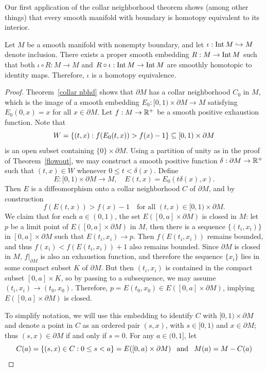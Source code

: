 Our first application of the collar neighborhood theorem shows (among other things) that every smooth manifold with boundary is homotopy equivalent to its
interior.
\begin{theorem}\label{homotopy equiv Int M to M}
Let $M$ be a smooth manifold with nonempty boundary, and let $\iota:\mathrm{Int}\, M\hookrightarrow M$ denote inclusion. There exists a proper smooth embedding $R:M\to\mathrm{Int}\, M$ such that both $\iota\circ R:M\to M$ and $R\circ\iota:\mathrm{Int}\, M\to\mathrm{Int}\, M$ are smoothly homotopic to identity maps. Therefore, $\iota$ is a homotopy equivalence.
\end{theorem}
\begin{proof}
Theorem~\ref{collar nbhd} shows that $\partial M$ has a collar neighborhood $C_0$ in $M$, which is the image of a smooth embedding $E_0:[0,1)\times\partial M\to M$ satisfying $E_0(0,x)=x$ for all $x\in\partial M$. Let $f:M\to\mathbb{R}^+$ be a smooth positive exhaustion function. Note that 
\[W=\{(t,x):f(E_0(t,x))>f(x)-1\}\subseteq [0,1)\times\partial M\] 
is an open subset containing $\{0\}\times\partial M$. Using a partition of unity as in the proof of Theorem~\ref{flowout}, we may construct a smooth positive function $\delta:\partial M\to\mathbb{R}^+$ such that $(t,x)\in W$ whenever $0\leq t<\delta(x)$. Define 
\[E:[0,1)\times\partial M\to M,\quad E(t,x)=E_0(t\delta(x),x).\] 
Then $E$ is a diffeomorphism onto a collar neighborhood $C$ of $\partial M$, and by construction 
\[f(E(t,x))>f(x)-1\quad\text{for all }(t,x)\in[0,1)\times\partial M.\] 
We claim that for each $a\in(0,1)$, the set $E([0,a]\times\partial M)$ is closed in $M$: let $p$ be a limit point of $E([0,a]\times\partial M)$ in $M$, then there is a sequence $\{(t_i,x_i)\}$ in $[0,a]\times\partial M$ such that $E(t_i,x_i)\to p$. Then $f(E(t_i,x_i))$ remains bounded, and thus $f(x_i)<f(E(t_i,x_i))+1$ also remains bounded. Since $\partial M$ is closed in $M$, $f|_{\partial M}$ is also an exhaustion function, and therefore the sequence $\{x_i\}$ lies in some compact subset $K$ of $\partial M$. But then $(t_i,x_i)$ is contained in the compact subset $[0,a]\times K$, so by passing to a subsequence, we may assume $(t_i,x_i)\to(t_0,x_0)$. Therefore, $p=E(t_0,x_0)\in E([0,a]\times\partial M)$, implying $E([0,a]\times\partial M)$ is closed.\par
To simplify notation, we will use this embedding to identify $C$ with $[0,1)\times\partial M$ and denote a point in $C$ as an ordered pair $(s,x)$, with $s\in[0,1)$ and $x\in\partial M$; thus $(s,x)\in\partial M$ if and only if $s=0$. For any $a\in(0,1]$, let 
\[C(a)=\{(s,x)\in C:0\leq s<a\}=E([0,a)\times\partial M)\hspace{8pt}\text{and}\hspace{8pt} M(a)=M-C(a)\]

\end{proof}
